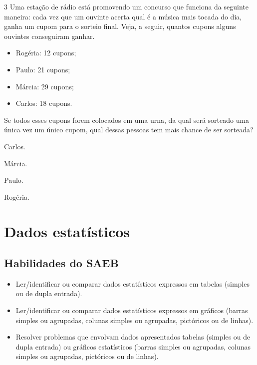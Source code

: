 \num{3} Uma estação de rádio está promovendo um concurso que funciona da seguinte maneira: cada vez que um ouvinte acerta qual é a música mais tocada do dia, ganha um cupom para o sorteio final. Veja, a seguir, quantos cupons alguns ouvintes conseguiram ganhar.

\begin{mdframed}[linewidth=2pt,linecolor=azul!20,backgroundcolor=azul!20,roundcorner=2pt]
\begin{itemize}
  \item Rogéria: 12 cupons;
  \item Paulo: 21 cupons;
  \item Márcia: 29 cupons;
  \item Carlos: 18 cupons.
\end{itemize}
\end{mdframed}

Se todos esses cupons forem colocados em uma urna, da qual será sorteado uma única vez um único cupom, qual dessas pessoas tem mais chance de ser sorteada?

\begin{escolha}
\item
  Carlos.
\item
  Márcia.
\item
  Paulo.
\item
  Rogéria.
\end{escolha}


\chapter{Dados estatísticos}

\section*{Habilidades do SAEB}

\begin{itemize}
\item Ler/identificar ou comparar dados estatísticos expressos em tabelas
(simples ou de dupla entrada).

\item Ler/identificar ou comparar dados estatísticos expressos em gráficos
(barras simples ou agrupadas, colunas simples ou agrupadas, pictóricos
ou de linhas).

\item Resolver problemas que envolvam dados apresentados tabelas (simples ou
de dupla entrada) ou gráficos estatísticos (barras simples ou agrupadas,
colunas simples ou agrupadas, pictóricos ou de linhas).
\end{itemize}

